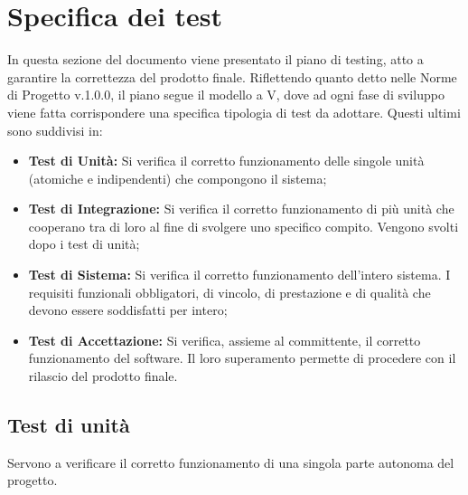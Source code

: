 \section{Specifica dei test}

In questa sezione del documento viene presentato il piano di testing, atto a garantire la correttezza del prodotto finale. Riflettendo quanto detto nelle Norme di Progetto v.1.0.0, il piano segue il modello a V, dove ad ogni fase di sviluppo viene fatta corrispondere una specifica tipologia di test da adottare. Questi ultimi sono suddivisi in:

\begin{itemize}
    \item \textbf{Test di Unità:} Si verifica il corretto funzionamento delle singole unità (atomiche e indipendenti) che compongono il sistema;
    \item \textbf{Test di Integrazione:} Si verifica il corretto funzionamento di più unità che cooperano tra di loro al fine di svolgere uno specifico compito. Vengono svolti dopo i test di unità;
    \item \textbf{Test di Sistema:} Si verifica il corretto funzionamento dell'intero sistema. I requisiti funzionali obbligatori, di vincolo, di prestazione e di qualità che devono essere soddisfatti per intero;
    \item \textbf{Test di Accettazione:} Si verifica, assieme al committente, il corretto funzionamento del software. Il loro superamento permette di procedere con il rilascio del prodotto finale.
\end{itemize}

\subsection{ Test di unità}
Servono a verificare il corretto funzionamento di una singola parte autonoma del progetto.